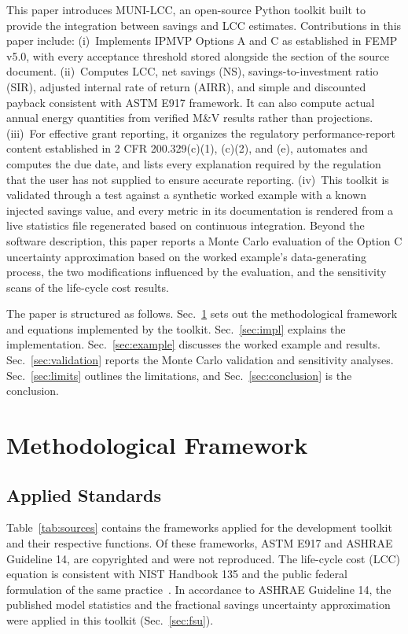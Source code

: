 \documentclass[10pt,twocolumn,letterpaper]{article}
\begin{document}
This paper introduces MUNI-LCC, an open-source Python toolkit built to provide the integration between savings and LCC estimates. Contributions in this paper include:
(i)~Implements IPMVP Options A and C as established in FEMP v5.0, with every acceptance threshold stored alongside the section of the source document.
(ii)~Computes LCC, net savings (NS), savings-to-investment ratio (SIR), adjusted internal rate of return (AIRR), and simple and discounted payback consistent with ASTM E917 framework. It can also compute actual annual energy quantities from verified M\&V results rather than projections.
(iii)~For effective grant reporting, it organizes the regulatory performance-report content established in 2 CFR 200.329(c)(1), (c)(2), and (e), automates and computes the due date, and lists every explanation required by the regulation that the user has not supplied to ensure accurate reporting.
(iv)~This toolkit is validated through a test against a synthetic worked example with a known injected savings value, and every metric in its documentation is rendered from a live statistics file regenerated based on continuous integration.
Beyond the software description, this paper reports a Monte Carlo evaluation of the Option C uncertainty approximation based on the worked example's data-generating process, the two modifications influenced by the evaluation, and the sensitivity scans of the life-cycle cost results.

The paper is structured as follows. Sec.~\ref{sec:framework} sets out the methodological framework and equations implemented by the toolkit. Sec.~\ref{sec:impl} explains the implementation. Sec.~\ref{sec:example} discusses the worked example and results. Sec.~\ref{sec:validation} reports the Monte Carlo validation and sensitivity analyses. Sec.~\ref{sec:limits} outlines the limitations, and Sec.~\ref{sec:conclusion} is the conclusion.

\section{Methodological Framework}\label{sec:framework}

\subsection{Applied Standards}

Table~\ref{tab:sources} contains the frameworks applied for the development toolkit and their respective functions. Of these frameworks, ASTM E917 and ASHRAE Guideline 14, are copyrighted and were not reproduced. The life-cycle cost (LCC) equation is consistent with NIST Handbook 135 and the public federal formulation of the same practice~\cite{fuller1996}. In accordance to ASHRAE Guideline 14, the published model statistics and the fractional savings uncertainty approximation were applied in this toolkit (Sec.~\ref{sec:fsu}).
\end{document}
